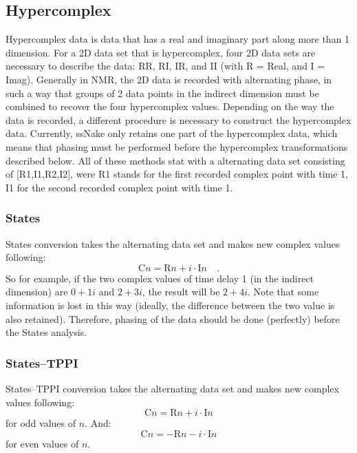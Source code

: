 \documentclass[11pt,a4paper]{article}
\begin{document}
\subsection{Hypercomplex}
Hypercomplex data is data that has a real and imaginary part along more than 1 dimension. For a 2D data set that is hypercomplex, four 2D data sets are necessary to
describe the data: RR, RI, IR, and II (with R = Real, and I = Imag).
Generally in NMR, the 2D data is recorded with alternating phase, in such a way that groups of 2 data points in the indirect dimension must be combined to recover
the four hypercomplex values. Depending on the way the data is recorded, a different procedure is necessary to construct the hypercomplex data.
Currently, ssNake only retains one part of the hypercomplex data, which means that phasing must be performed before the hypercomplex transformations described below. 
All of these methods stat with a alternating data set consisting of [R1,I1,R2,I2], were R1 stands for the first recorded complex point with time 1, I1 for the second
recorded complex point with time 1.

\subsubsection{States}
States conversion takes the alternating data set and makes new complex values following:
\begin{equation*}
  \text{C}n = \text{R}n + i \cdot \text{I}n \quad .
\end{equation*}
So for example, if the two complex values of time delay 1 (in the indirect dimension) are $0+1i$ and $2+3i$, the result will be $2+4i$. Note that some 
information is lost in this way (ideally, the difference between the two value is also retained). Therefore, phasing of the data should be done (perfectly) before the States analysis.

\subsubsection{States--TPPI}

States--TPPI conversion takes the alternating data set and makes new complex values following:
\begin{equation*}
  \text{C}n = \text{R}n + i \cdot \text{I}n 
\end{equation*}
for odd values of $n$. And:
\begin{equation*}
  \text{C}n = -\text{R}n - i \cdot \text{I}n 
\end{equation*}
for even values of $n$.
\end{document}
